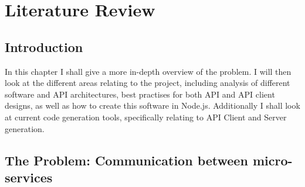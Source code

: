 \chapter{Literature Review}
\section{Introduction}
In this chapter I shall give a more in-depth overview of the problem. I will then look at the different areas relating to the project, including analysis of different software and API architectures, best practises for both API and API client designs, as well as how to create this software in Node.js. Additionally I shall look at current code generation tools, specifically relating to API Client and Server generation.

\section{The Problem: Communication between micro-services}

